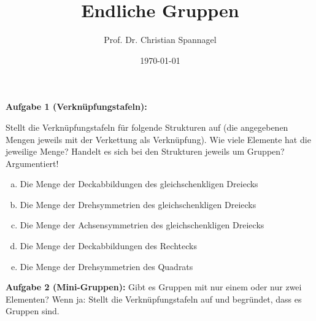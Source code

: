 \documentclass{../cssheet}
\title{Endliche Gruppen}
\author{Prof. Dr. Christian Spannagel}
\date{\today}
\begin{document}
\printtitle


\textbf{Aufgabe 1 (Verknüpfungstafeln):} 

Stellt die Verknüpfungstafeln für folgende Strukturen auf (die angegebenen Mengen jeweils mit der Verkettung als Verknüpfung). Wie viele Elemente hat die jeweilige Menge? Handelt es sich bei den Strukturen jeweils um Gruppen? Argumentiert!
\begin{enumerate}[a)]
\item Die Menge der Deckabbildungen des gleichschenkligen Dreiecks
\item Die Menge der Drehsymmetrien des gleichschenkligen Dreiecks
\item Die Menge der Achsensymmetrien des gleichschenkligen Dreiecks
\item Die Menge der Deckabbildungen des Rechtecks
\item Die Menge der Drehsymmetrien des Quadrats
\end{enumerate}

\textbf{Aufgabe 2 (Mini-Gruppen):}  Gibt es Gruppen mit nur einem oder nur zwei Elementen? Wenn ja: Stellt die Verknüpfungstafeln auf und begründet, dass es Gruppen sind.


\vspace*{2cm}
\printlicense

\printsocials
\end{document}

